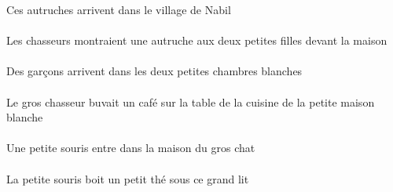 \begin{exe}
Ces autruches arrivent dans le village de Nabil
\ex\gll
\DEFSgObl{}   \maisonDSgObl{}   \DEVANT{}   \DEFPlErg{}   \chasseurCPlErg{}    \DEFDuDat{}   \petitCDu{}   \filleCDuDat{}   \INDSgAbs{}   \autrucheDSgAbs{}  \montrerVdPstDSg{}\\
\DEFSgOblP{}   \maisonDSgOblP{}   \DEVANTP{}   \DEFPlErgP{}   \chasseurCPlErgP{}    \DEFDuDatP{}   \petitCDuP{}   \filleCDuDatP{}   \INDSgAbsP{}   \autrucheDSgAbsP{}  \montrerVdPstDSgP{}\\
Les chasseurs montraient une autruche aux deux petites filles devant la maison
\ex\gll
\INDPlAbs{}   \garconBPlAbs{}    \DEFDuObl{}   \petitBDu{}   \blancBDu{}   \chambreBDuObl{}   \DANS{}  \arriverViPrsBPl{}\\
\INDPlAbsP{}   \garconBPlAbsP{}    \DEFDuOblP{}   \petitBDuP{}   \blancBDuP{}   \chambreBDuOblP{}   \DANSP{}  \arriverViPrsBPlP{}\\
Des garçons arrivent dans les deux petites chambres blanches
\ex\gll
\DEFSgObl{}    \DEFSgObl{}    \DEFSgObl{}   \petitDSg{}   \blancDSg{}   \maisonDSgObl{}   \DE{}   \cuisineCSgObl{}   \DE{}   \tableCSgObl{}   \SUR{}   \DEFSgErg{}   \grosCSg{}   \chasseurCSgErg{}   \INDSgAbs{}   \cafeDSgAbs{}  \boireVtPstDSg{}\\
\DEFSgOblP{}    \DEFSgOblP{}    \DEFSgOblP{}   \petitDSgP{}   \blancDSgP{}   \maisonDSgOblP{}   \DEP{}   \cuisineCSgOblP{}   \DEP{}   \tableCSgOblP{}   \SURP{}   \DEFSgErgP{}   \grosCSgP{}   \chasseurCSgErgP{}   \INDSgAbsP{}   \cafeDSgAbsP{}  \boireVtPstDSgP{}\\
Le gros chasseur buvait un café sur la table de la cuisine de la petite maison blanche
\ex\gll
\INDSgAbs{}   \petitASg{}   \sourisASgAbs{}    \DEFSgObl{}    \DEFSgObl{}   \grosDSg{}   \chatDSgObl{}   \DE{}   \maisonDSgObl{}   \DANS{}  \entrerViPrsASg{}\\
\INDSgAbsP{}   \petitASgP{}   \sourisASgAbsP{}    \DEFSgOblP{}    \DEFSgOblP{}   \grosDSgP{}   \chatDSgOblP{}   \DEP{}   \maisonDSgOblP{}   \DANSP{}  \entrerViPrsASgP{}\\
Une petite souris entre dans la maison du gros chat
\ex\gll
\DEMSgObl{}   \grandDSg{}   \litDSgObl{}   \SOUS{}   \DEFSgErg{}   \petitASg{}   \sourisASgErg{}   \INDSgAbs{}   \petitBSg{}   \theBSgAbs{}  \boireVtPrsBSg{}\\
\DEMSgOblP{}   \grandDSgP{}   \litDSgOblP{}   \SOUSP{}   \DEFSgErgP{}   \petitASgP{}   \sourisASgErgP{}   \INDSgAbsP{}   \petitBSgP{}   \theBSgAbsP{}  \boireVtPrsBSgP{}\\
La petite souris boit un petit thé sous ce grand lit

\end{exe}

